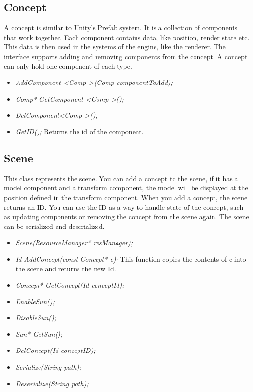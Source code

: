 \documentclass{article}
\begin{document}
\subsection{Concept}
A concept is similar to Unity's Prefab system. 
It is a collection of components that work together. 
Each component contains data, like position, render state etc. 
This data is then used in the systems of the engine, like the renderer.
The interface supports adding and removing components from the concept.
A concept can only hold one component of each type.
\begin{tcolorbox}[colback=blue!5!white,colframe=blue!75!black,title=Concept Interface]
    \begin{itemize}
        \item \textit{AddComponent \textless Comp \textgreater(Comp componentToAdd);}
        \item \textit{Comp* GetComponent \textless Comp \textgreater();}
        \item \textit{DelComponent\textless Comp \textgreater ();}
        \item \textit{GetID();}
        Returns the id of the component. 
    \end{itemize}    
\end{tcolorbox}

\subsection{Scene}
This class represents the scene. 
You can add a concept to the scene, if it has a model component and a transform component, the model will be displayed at the position defined in the transform component.  
When you add a concept, the scene returns an ID. You can use the ID as a way to handle state of the concept, such as updating components or removing the concept from the scene again.
The scene can be serialized and deserialized.
\begin{tcolorbox}[colback=blue!5!white,colframe=blue!75!black,title=Scene Interface]
    \begin{itemize}
        \item \textit{Scene(ResourceManager* resManager);}
        \item \textit{Id AddConcept(const Concept* c);}
        This function copies the contents of c into the scene and returns the new Id.
        \item \textit{Concept* GetConcept(Id conceptId);}
        \item \textit{EnableSun();}
        \item \textit{DisableSun();}
        \item \textit{Sun* GetSun();}
        \item \textit{DelConcept(Id conceptID);}
        \item \textit{Serialize(String path);}
        \item \textit{Deserialize(String path);}
    \end{itemize}    
\end{tcolorbox}
\end{document}
